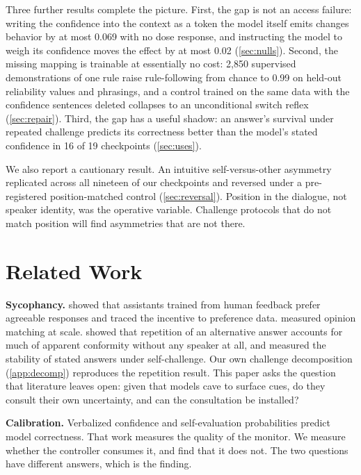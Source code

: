\documentclass{article}
\begin{document}
Three further results complete the picture. First, the gap is not an access failure: writing the confidence into the context as a token the model itself emits changes behavior by at most 0.069 with no dose response, and instructing the model to weigh its confidence moves the effect by at most 0.02 (\cref{sec:nulls}). Second, the missing mapping is trainable at essentially no cost: 2{,}850 supervised demonstrations of one rule raise rule-following from chance to 0.99 on held-out reliability values and phrasings, and a control trained on the same data with the confidence sentences deleted collapses to an unconditional switch reflex (\cref{sec:repair}). Third, the gap has a useful shadow: an answer's survival under repeated challenge predicts its correctness better than the model's stated confidence in 16 of 19 checkpoints (\cref{sec:uses}).

We also report a cautionary result. An intuitive self-versus-other asymmetry replicated across all nineteen of our checkpoints and reversed under a pre-registered position-matched control (\cref{sec:reversal}). Position in the dialogue, not speaker identity, was the operative variable. Challenge protocols that do not match position will find asymmetries that are not there.

\section{Related Work}
\label{sec:related}

\textbf{Sycophancy.} \citet{sharma2024sycophancy} showed that assistants trained from human feedback prefer agreeable responses and traced the incentive to preference data. \citet{perez2023discovering} measured opinion matching at scale. \citet{hu2026conformity} showed that repetition of an alternative answer accounts for much of apparent conformity without any speaker at all, and \citet{saadat2026certainty} measured the stability of stated answers under self-challenge. Our own challenge decomposition (\cref{app:decomp}) reproduces the repetition result. This paper asks the question that literature leaves open: given that models cave to surface cues, do they consult their own uncertainty, and can the consultation be installed?

\textbf{Calibration.} Verbalized confidence \citep{lin2022teaching, tian2023just, xiong2024can} and self-evaluation probabilities \citep{kadavath2022language} predict model correctness. That work measures the quality of the monitor. We measure whether the controller consumes it, and find that it does not. The two questions have different answers, which is the finding.
\end{document}
